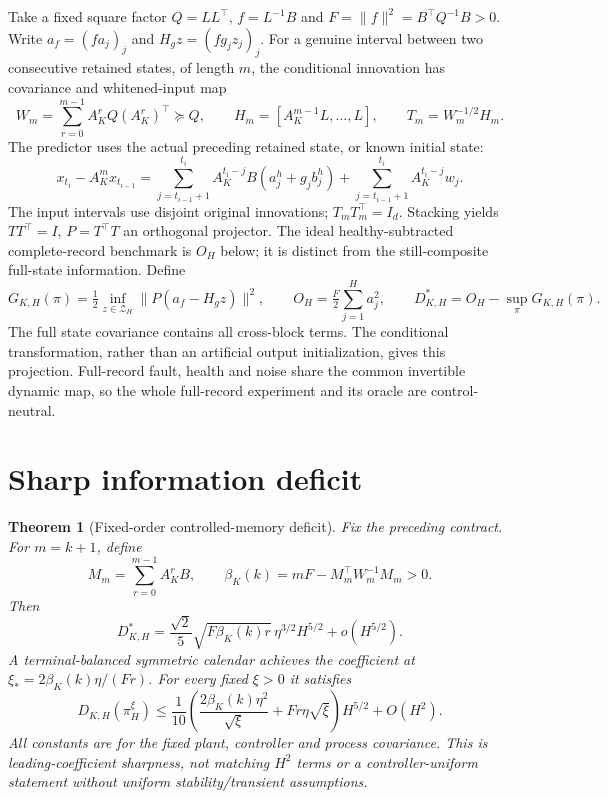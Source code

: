 \documentclass[11pt]{article}
\newtheorem{theorem}{Theorem}
\begin{document}
Take a fixed square factor $Q=LL^\top$, $f=L^{-1}B$ and
$F=\|f\|^2=B^\top Q^{-1}B>0$.
Write $a_f=(f a_j)_j$ and $H_gz=(f g_j z_j)_j$.
For a genuine interval between two consecutive retained states, of length $m$,
the conditional innovation has covariance and whitened-input map
\[
W_m=\sum_{r=0}^{m-1}A_K^rQ(A_K^r)^\top\succeq Q,\qquad
H_m=[A_K^{m-1}L,\ldots,L],\qquad T_m=W_m^{-1/2}H_m .
\]
The predictor uses the actual preceding retained state, or known initial state:
\[
x_{t_i}-A_K^m x_{t_{i-1}}
=\sum_{j=t_{i-1}+1}^{t_i}A_K^{t_i-j}B(a_j^h+g_jb_j^h)
+\sum_{j=t_{i-1}+1}^{t_i}A_K^{t_i-j}w_j .
\]
The input intervals use disjoint original innovations; $T_mT_m^\top=I_d$.
Stacking yields $TT^\top=I$, $P=T^\top T$ an orthogonal projector.
The ideal healthy-subtracted complete-record benchmark is $O_H$ below;
it is distinct from the still-composite full-state information. Define
\[
G_{K,H}(\pi)=\tfrac12\inf_{z\in\mathcal Z_H}\|P(a_f-H_gz)\|^2,\qquad
O_H=\tfrac F2\sum_{j=1}^H a_j^2,\qquad
D_{K,H}^*=O_H-\sup_\pi G_{K,H}(\pi).
\]
The full state covariance contains all cross-block terms. The conditional
transformation, rather than an artificial output initialization, gives this
projection. Full-record fault, health and noise share the common invertible
dynamic map, so the whole full-record experiment and its oracle are
control-neutral.

\section{Sharp information deficit}\begin{theorem}[Fixed-order controlled-memory deficit]\label{thm:main}
Fix the preceding contract. For $m=k+1$, define
\[
M_m=\sum_{r=0}^{m-1}A_K^rB,\qquad
\beta_K(k)=mF-M_m^\top W_m^{-1}M_m>0.
\]
Then
\begin{equation}\label{eq:sharp}
D_{K,H}^*=\frac{\sqrt2}{5}\sqrt{F\beta_K(k)r}\,\eta^{3/2}H^{5/2}
+o(H^{5/2}).
\end{equation}
A terminal-balanced symmetric calendar achieves the coefficient at
$\xi_*=2\beta_K(k)\eta/(Fr)$. For every fixed $\xi>0$ it satisfies
\begin{equation}\label{eq:upper}
D_{K,H}(\pi_H^\xi)\le\frac1{10}
\left(\frac{2\beta_K(k)\eta^2}{\sqrt\xi}+Fr\eta\sqrt\xi\right)H^{5/2}
+O(H^2).
\end{equation}
All constants are for the fixed plant, controller and process covariance.
This is leading-coefficient sharpness, not matching $H^2$ terms or a
controller-uniform statement without uniform stability/transient assumptions.
\end{theorem}
\end{document}
